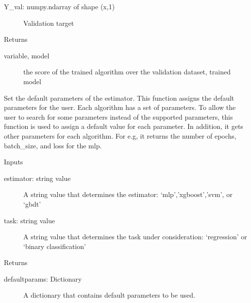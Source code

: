\documentclass[letterpaper,10pt,english]{sphinxmanual}
\begin{document}
\begin{fulllineitems}
\begin{fulllineitems}
\begin{description}
\item[{Y\_val: numpy.ndarray of shape (x,1)}] \leavevmode
Validation target

\end{description}

Returns
\begin{description}
\item[{variable, model}] \leavevmode
the score of the trained algorithm over the validation dataset, trained model

\end{description}

\end{fulllineitems}


\begin{fulllineitems}
\label{\detokenize{index:pspso.pspso.get_default_params}}
Set the default parameters of the estimator.
This function assigns the default parameters for the user.
Each algorithm has a set of parameters. To allow the user to search for some parameters
instead of the supported parameters, this function is used to assign a default value for each parameter.
In addition, it gets other parameters for each algorithm. For e.g, it returns the number of epochs, batch\_size, and loss for the mlp.

Inputs
\begin{description}
\item[{estimator: string value}] \leavevmode
A string value that determines the estimator: ‘mlp’,’xgboost’,’svm’, or ‘gbdt’

\item[{task: string value}] \leavevmode
A string value that determines the task under consideration: ‘regression’ or ‘binary classification’

\end{description}

Returns
\begin{description}
\item[{defaultparams: Dictionary}] \leavevmode
A dictionary that contains default parameters to be used.

\end{description}

\end{fulllineitems}


\end{fulllineitems}
\end{document}
